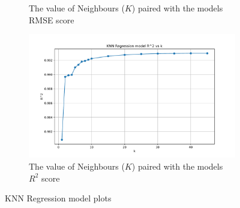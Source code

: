 \begin{figure}[!htbp]
\begin{subfigure}[b]{0.45\textwidth}
        \caption{The value of Neighbours ($K$) paired with the models RMSE score}
        \label{Fig: KNN K vs RMSE}
    \end{subfigure}
    \hfill
    \begin{subfigure}[b]{0.45\textwidth}
        \includegraphics[width=\textwidth]{../regression_model/plots/KNN_Regression/KNN Regression model R^2 vs k.pdf}
        \caption{The value of Neighbours ($K$) paired with the models $R^2$ score}
        \label{Fig: KNN K vs R^2}
    \end{subfigure}
    \caption{KNN Regression model plots}
\end{figure}

